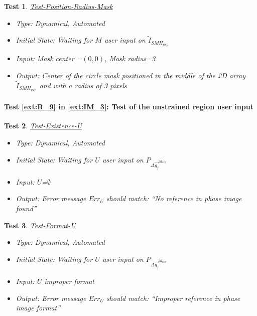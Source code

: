 \documentclass[12pt, titlepage]{article}
\newtheorem{Test}{Test}
\begin{document}
\begin{Test}\normalfont\underline{Test-Position-Radius-Mask}
\label{Test-Position-Radius-Mask}
\begin{itemize}
\item Type: Dynamical, Automated
\item Initial State: Waiting for $M$ user input on $\widetilde{I}_{\mathit{SMH}_{\text{exp}}}$
\item Input: Mask center =$(0,0)$, Mask radius=3
\item Output: Center of the circle mask positioned in the middle of the 2D array $\widetilde{I}_{\mathit{SMH}_{\text{exp}}}$ and with a radius of 3 pixels
\end{itemize}
\end{Test}

\paragraph{Test \cref{ext:R_9} in \cref{ext:IM_3}: Test of the unstrained region user input}

\begin{Test}\normalfont\underline{Test-Existence-U}
\label{Test-Existence-U}
\begin{itemize}
\item Type: Dynamical, Automated
\item Initial State: Waiting for $U$ user input on $P_{\Delta \overrightarrow{g_{j}}^{M_{exp}}}$
\item Input: $U$=$\emptyset$
\item Output:  Error message $Err_{U}$ should match: \enquote{No reference in phase image found}
\end{itemize}
\end{Test}

\begin{Test}\normalfont\underline{Test-Format-U}
\label{Test-Format-U}
\begin{itemize}
\item Type: Dynamical, Automated
\item Initial State: Waiting for $U$ user input on $P_{\Delta \overrightarrow{g_{j}}^{M_{exp}}}$
\item Input: $U$ improper format
\item Output:  Error message $Err_{U}$ should match: \enquote{Improper reference in phase image format}
\end{itemize}
\end{Test}
\end{document}
